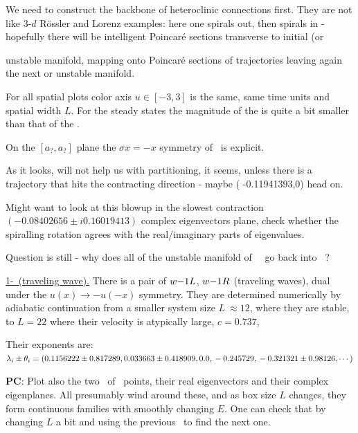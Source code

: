We need to construct the backbone of heteroclinic connections
first. They are not like 3-$d$ R\"ossler and Lorenz examples:
here one spirals out,
then spirals in - hopefully there will be intelligent Poincar\'e sections
transverse to initial  (or { unstable manifold, mapping onto
Poincar\'e sections of trajectories leaving again
the next  or  unstable manifold.

%

For all spatial plots color axis $u \in [-3, 3]$ is the same,
same time units and spatial width $L$.
For the steady states the magnitude of the  is quite
a bit smaller than that of the .

On the
    $[a_?,a_?]$ plane
    the $\sigma x = -x$ symmetry of \KSe\ is explicit.


As it looks, will not help us with partitioning, it seems, unless there is
a trajectory that hits the contracting direction - maybe
( -0.11941393,0)
head on.

Might want to look at this blowup in
the  slowest contraction
$   ( -0.08402656 \pm i 0.16019413)$
complex eigenvectors plane, check whether the
spiralling rotation agrees with the real/imaginary parts of eigenvalues.

Question is still - why does all of the unstable manifold of
~\eqv\ go back
into
~\eqv?


\underline{1-\reqv\  (traveling wave).}
There is a pair of {\reqva}
${w-}1L$,
${w-}1R$
(traveling waves), dual under the
$u(x) \to -u(-x)$ symmetry. They are
determined numerically by
adiabatic continuation from a smaller system size
$L~\approx 12$,
where they are stable, to $L=22$
where their velocity is atypically large, $c=0.737$,

Their exponents are:
\\
$\lambda_i \pm \theta_i =
(
\\
  0.1156222 \pm 0.817289,   \\
  0.033663 \pm 0.418909,    \\
 0.0                    ,   \\
 -0.245729                    , \\
 -0.321321 \pm 0.98126,
\cdots
)$

{\bf PC}:
Plot also the two \eqva\ of \eqva\ points, their
real eigenvectors and their complex eigenplanes. All {\eqva} presumably
wind around these, and as box size $L$ changes, they form continuous
families with smoothly changing $E$. One can check that by
changing $L$ a bit and using the previous \eqv\ to find the next
one.

}
